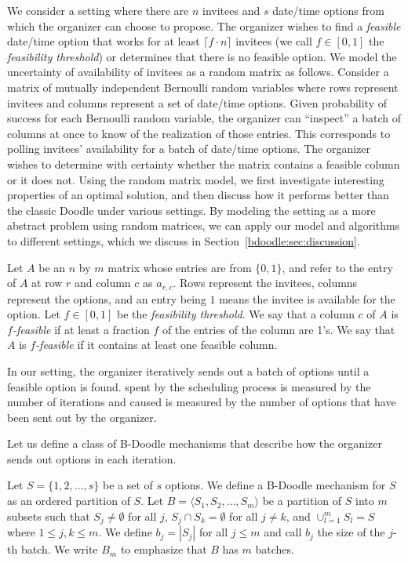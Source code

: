 We consider a setting where there are $n$ invitees and $s$ date/time options from which the organizer can choose to propose. The organizer wishes to find a {\em feasible} date/time option that works for at least $\lceil f \cdot n \rceil$ invitees (we call $f\in [0,1]$ the {\em feasibility threshold}) or determines that there is no feasible option.
We model the uncertainty of availability of invitees as a random matrix as follows.
Consider a matrix of mutually independent Bernoulli random variables where rows represent invitees and columns represent a set of date/time options. 
Given probability of success for each Bernoulli random variable, the organizer can ``inspect'' a batch of columns at once to know of the realization of those entries. This corresponds to polling invitees' availability for a batch of date/time options. The organizer wishes to determine with certainty whether the matrix contains a feasible column or it does not. Using the random matrix model, we first investigate interesting properties of an optimal solution, and then discuss how it performs better than the classic Doodle under various settings.
By modeling the setting as a more abstract problem using random matrices, we can apply our model and algorithms to different settings, which we discuss in Section~\ref{bdoodle:sec:discussion}.

 \begin{definition}[Feasibility]
 Let $A$ be an $n$ by $m$ matrix whose entries are from $\{0,1\}$, and refer to the entry of $A$ at row $r$ and column $c$ as $a_{r,c}$.
 Rows represent the invitees, columns represent the options, and an entry being $1$ means the invitee is available for the option. 
 Let $f \in [0,1]$ be the {\em feasibility threshold}.
 We say that a column $c$ of $A$ is {\em $f$-feasible} if at least a fraction $f$ of the entries of the column are 1's.
 We say that $A$ is {\em $f$-feasible} if it contains at least one feasible column.
 \end{definition}
 
In our setting, the organizer iteratively sends out a batch of options until a feasible option is found. 
\Times spent by the scheduling process is measured by the number of iterations and \Inconveniences caused is measured by the number of options that have been sent out by the organizer.

Let us define a class of B-Doodle mechanisms that describe how the organizer sends out options in each iteration.
\begin{definition}\label{bdoodle:def:BDoodleMechanism}
Let $S = \{1, 2, \dots, s\}$ be a set of $s$ options.
We define a B-Doodle mechanism for $S$ as an ordered partition of $S$.
Let $B = \langle S_1, S_2, \dots, S_m \rangle$ be a partition of $S$ into $m$ subsets such that $S_j \neq\emptyset$ for all $j$, $S_j \cap S_k = \emptyset$ for all $j \neq k$, and $\cup_{l=1}^{m} S_l = S$ where $1 \leq j,k \leq m$.
We define $b_j = |S_j|$ for all $j \leq m$ and call $b_j$ the size of the $j$-th batch.
We write $B_m$ to emphasize that $B$ has $m$ batches.
\end{definition}




